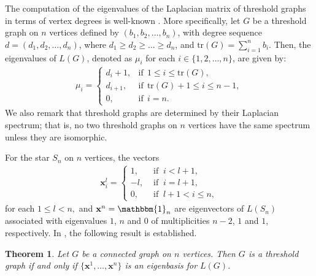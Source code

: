 \documentclass[preprint]{elsarticle}
\newtheorem{theorem}{Theorem}[section]
\begin{document}
The computation of the eigenvalues of the Laplacian matrix of threshold graphs in terms of vertex degrees is well-known \cite{Merris94}. More specifically, let $G$ be a threshold graph on $n$ vertices defined by $(b_{1}, b_{2}, \ldots, b_{n})$, with degree sequence $d = (d_{1} ,d_{2},\ldots, d_n)$, where $d_1\geq d_2\geq \ldots \geq d_n$, and $\text{tr}(G)=\displaystyle\sum_{i=1}^{n}b_i$. Then, the  eigenvalues of $L(G)$, denoted as $\mu_{i}$ for each $i \in \{1, 2, \ldots, n\}$, are given by:
    \begin{align}\label{spectrum  threshold}
    \mu_i = \left\{\begin{array}{rll}
        d_i +1,  & \text{if} \ \ 1 \leq i\leq \text{tr}(G),\\
        d_{i+1}, & \text{if} \ \ \text{tr}(G) + 1 \leq i \leq n-1,\\
        0,       & \text{if} \ \ i =n.
    \end{array}\right.
    \end{align}
We also remark that threshold graphs are determined by their Laplacian spectrum; that is, no two {threshold graphs} on $n$ vertices have the same spectrum {unless they are isomorphic}.

For the star $S_n$ on $n$ vertices, the vectors %
\begin{align}
\label{base da estrela}
        \mathbf{x}^{l}_{i} = \left\{\begin{array}{rll}
        1,  & \text{ if } \ i< l+1,\\
        -l, & \text{ if } \ i = l+1,\\
        0,  & \text{ if } \ l+1 <i \leq n, 
    \end{array}\right.
    \end{align}
for each $ 1\leq l < n,$ and $\mathbf{x}^{n} = \mathbbm{1}_n$ are eigenvectors of $L(S_{n})$ 
associated with eigenvalues  $1$, $n$ and $0$ of multiplicities $n-2$, $1$ and $1$, respectively. In \cite{MDTL24}, the following result is established.

\begin{theorem}
 \label{TeoPrincipal} 
Let $G$ be a connected graph on $n$ vertices. Then $G$ is a threshold graph if and only if  $\{\mathbf{x}^{1}, \ldots, \mathbf{x}^{n}\}$ is an eigenbasis for $L(G)$. 
\end{theorem}

\end{document}
